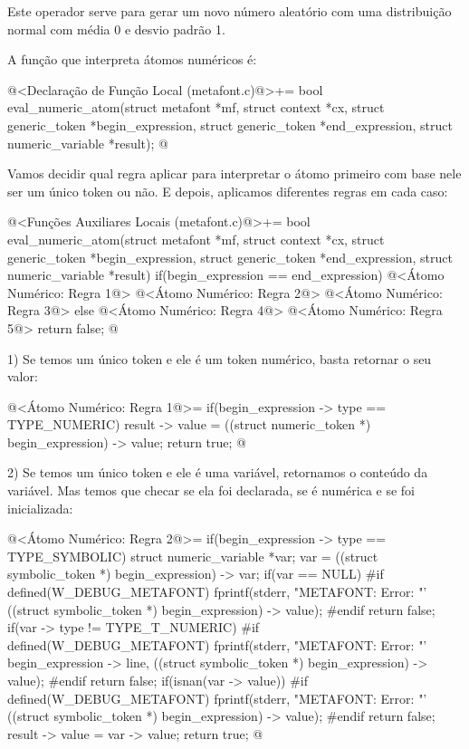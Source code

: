 Este operador serve para gerar um novo número aleatório com uma
distribuição normal com média 0 e desvio padrão 1.

A função que interpreta átomos numéricos é:

\iniciocodigo
@<Declaração de Função Local (metafont.c)@>+=
bool eval_numeric_atom(struct metafont *mf, struct context *cx,
                       struct generic_token *begin_expression,
                       struct generic_token *end_expression,
                       struct numeric_variable *result);
@
\fimcodigo

Vamos decidir qual regra aplicar para interpretar o átomo primeiro com
base nele ser um único token ou não. E depois, aplicamos diferentes
regras em cada caso:

\iniciocodigo
@<Funções Auxiliares Locais (metafont.c)@>+=
bool eval_numeric_atom(struct metafont *mf, struct context *cx,
                       struct generic_token *begin_expression,
                       struct generic_token *end_expression,
                       struct numeric_variable *result){
  if(begin_expression == end_expression){
    @<Átomo Numérico: Regra 1@>
    @<Átomo Numérico: Regra 2@>
    @<Átomo Numérico: Regra 3@>
  }
  else{
    @<Átomo Numérico: Regra 4@>
    @<Átomo Numérico: Regra 5@>
  }
  return false;
}
@

1) Se temos um único token e ele é um token numérico, basta retornar o
seu valor:

\iniciocodigo
@<Átomo Numérico: Regra 1@>=
if(begin_expression -> type == TYPE_NUMERIC){
  result -> value = ((struct numeric_token *) begin_expression) -> value;
  return true;
}
@
\fimcodigo

2) Se temos um único token e ele é uma variável, retornamos o conteúdo
da variável. Mas temos que checar se ela foi declarada, se é numérica
e se foi inicializada:

\iniciocodigo
@<Átomo Numérico: Regra 2@>=
if(begin_expression -> type == TYPE_SYMBOLIC){
  struct numeric_variable *var;
  var = ((struct symbolic_token *) begin_expression) -> var;
  if(var == NULL){
#if defined(W_DEBUG_METAFONT)
    fprintf(stderr, "METAFONT: Error: %
            "'%
            ((struct symbolic_token *) begin_expression) -> value);
#endif
    return false;
  }
  if(var -> type != TYPE_T_NUMERIC){
#if defined(W_DEBUG_METAFONT)
    fprintf(stderr, "METAFONT: Error: %
            "'%
            begin_expression -> line,
            ((struct symbolic_token *) begin_expression) -> value);
#endif
    return false;
  }
  if(isnan(var -> value)){
#if defined(W_DEBUG_METAFONT)
    fprintf(stderr, "METAFONT: Error: %
            "'%
            ((struct symbolic_token *) begin_expression) -> value);
#endif
    return false;
  }
  result -> value = var -> value;
  return true;
}
@
\fimcodigo


